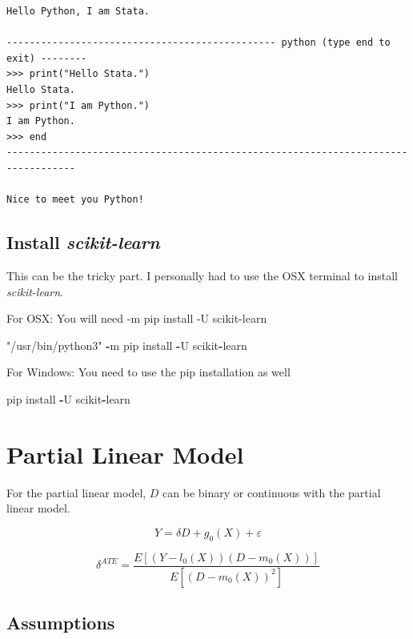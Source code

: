 \documentclass[
]{book}
\newenvironment{Shaded}{\begin{snugshade}}{\end{snugshade}}
\newcommand{\NormalTok}[1]{#1}
\newcommand{\SpecialCharTok}[1]{\textcolor[rgb]{0.81,0.36,0.00}{\textbf{#1}}}
\newcommand{\StringTok}[1]{\textcolor[rgb]{0.31,0.60,0.02}{#1}}
\begin{document}
\begin{verbatim}
Hello Python, I am Stata.

----------------------------------------------- python (type end to exit) --------
>>> print("Hello Stata.")
Hello Stata.
>>> print("I am Python.")
I am Python.
>>> end
----------------------------------------------------------------------------------

Nice to meet you Python!
\end{verbatim}

\section{\texorpdfstring{Install \emph{scikit-learn}}{Install scikit-learn}}\label{install-scikit-learn}

This can be the tricky part. I personally had to use the OSX terminal to install \emph{scikit-learn}.

For OSX:
You will need -m pip install -U scikit-learn

\begin{Shaded}
\begin{Highlighting}[]
\StringTok{"/usr/bin/python3"} \SpecialCharTok{{-}}\NormalTok{m pip install }\SpecialCharTok{{-}}\NormalTok{U scikit}\SpecialCharTok{{-}}\NormalTok{learn}
\end{Highlighting}
\end{Shaded}

For Windows:
You need to use the pip installation as well

\begin{Shaded}
\begin{Highlighting}[]
\NormalTok{pip install }\SpecialCharTok{{-}}\NormalTok{U scikit}\SpecialCharTok{{-}}\NormalTok{learn}
\end{Highlighting}
\end{Shaded}

\chapter{Partial Linear Model}\label{partial-linear-model}

For the partial linear model, \(D\) can be binary or continuous with the partial linear model.

\[ Y=\delta D+g_0(X)+\varepsilon \]

\[ \delta^{ATE} = \frac{E[(Y-l_0(X))(D-m_0(X))] }{E[(D-m_0(X))^2 ]} \]

\section{Assumptions}\label{assumptions}
\end{document}
